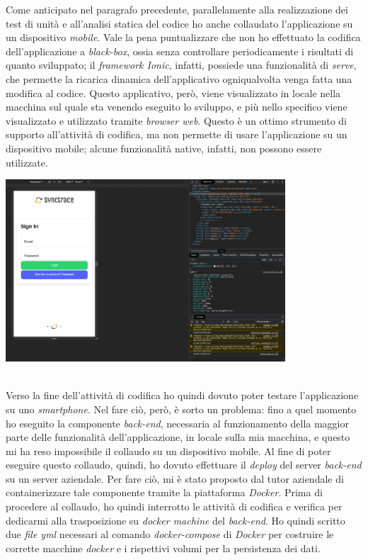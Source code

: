 Come anticipato nel paragrafo precedente, parallelamente alla realizzazione dei test di unità e all'analisi statica del codice ho anche collaudato l'applicazione su un dispositivo \textit{mobile}. Vale la pena puntualizzare che non ho effettuato la codifica dell'applicazione a \textit{black-box}, ossia senza controllare periodicamente i risultati di quanto sviluppato; il \textit{framework Ionic}, infatti, possiede una funzionalità di \textit{serve}, che permette la ricarica dinamica dell'applicativo ogniqualvolta venga fatta una modifica al codice. Questo applicativo, però, viene visualizzato in locale nella macchina sul quale sta venendo eseguito lo sviluppo, e più nello specifico viene visualizzato e utilizzato tramite \textit{browser web}. Questo è un ottimo strumento di supporto all'attività di codifica, ma non permette di usare l'applicazione su un dispositivo mobile; alcune funzionalità native, infatti, non possono essere utilizzate. \\

\begin{minipage}{\linewidth}
  \centering
    \includegraphics[height=6.8cm]{immagini/ionicserve}
\end{minipage} \\


Verso la fine dell'attività di codifica ho quindi dovuto poter testare l'applicazione su uno \textit{smartphone}. Nel fare ciò, però, è sorto un problema: fino a quel momento ho eseguito la componente \textit{back-end}, necessaria al funzionamento della maggior parte delle funzionalità dell'applicazione, in locale sulla mia macchina, e questo mi ha reso impossibile il collaudo su un dispositivo mobile. Al fine di poter eseguire questo collaudo, quindi, ho dovuto effettuare il \textit{deploy} del server \textit{back-end} su un server aziendale. Per fare ciò, mi è stato proposto dal tutor aziendale di containerizzare tale componente tramite la piattaforma \textit{Docker}. Prima di procedere al collaudo, ho quindi interrotto le attività di codifica e verifica per dedicarmi alla trasposizione su \textit{docker machine} del \textit{back-end}. Ho quindi scritto due \textit{file yml} necessari al comando \textit{docker-compose} di \textit{Docker} per costruire le corrette macchine \textit{docker} e i rispettivi volumi per la persistenza dei dati. \\

